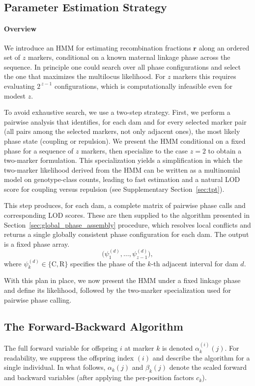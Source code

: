 \documentclass[11pt]{article}
\begin{document}
\subsection{Parameter Estimation Strategy}
\label{sec:param_estimation}
\paragraph{Overview}
We introduce an HMM for estimating recombination fractions \(\mathbf{r}\) along an ordered set of \(z\) markers, conditional on a known maternal linkage phase across the sequence. In principle one could search over all phase configurations and select the one that maximizes the multilocus likelihood. For \(z\) markers this requires evaluating \(2^{\,z-1}\) configurations, which is computationally infeasible even for modest \(z\).

To avoid exhaustive search, we use a two-step strategy. First, we perform a pairwise analysis that identifies, for each dam and for every selected marker pair (all pairs among the selected markers, not only adjacent ones), the most likely phase state (coupling or repulsion). We present the HMM conditional on a fixed phase for a sequence of \(z\) markers, then specialize to the case \(z=2\) to obtain a two-marker formulation. This specialization yields a simplification in which the two-marker likelihood derived from the HMM can be written as a multinomial model on genotype-class counts, leading to fast estimation and a natural LOD score for coupling versus repulsion (see Supplementary Section~\ref{sec:tpt}).

This step produces, for each dam, a complete matrix of pairwise phase calls and corresponding LOD scores. These are then supplied to the algorithm presented in Section~\ref{sec:global_phase_assembly} procedure, which resolves local conflicts and returns a single globally consistent phase configuration for each dam. The output is a fixed phase array.
\[
\bigl(\psi^{(d)}_1,\ldots,\psi^{(d)}_{z-1}\bigr),
\]
where \(\psi^{(d)}_k \in \{\mathrm{C},\mathrm{R}\}\) specifies the phase of the \(k\)-th adjacent interval for dam \(d\).

With this plan in place, we now present the HMM under a fixed linkage phase and define its likelihood, followed by the two-marker specialization used for pairwise phase calling.


\subsection{The Forward-Backward Algorithm}
The full forward variable for offspring $i$ at marker $k$ is denoted $\alpha_k^{(i)}(j)$. 
For readability, we suppress the offspring index $(i)$ and describe the algorithm for a single individual. In what follows, $\alpha_k(j)$ and $\beta_k(j)$ denote the scaled forward and backward variables (after applying the per-position factors $c_k$).
\end{document}
